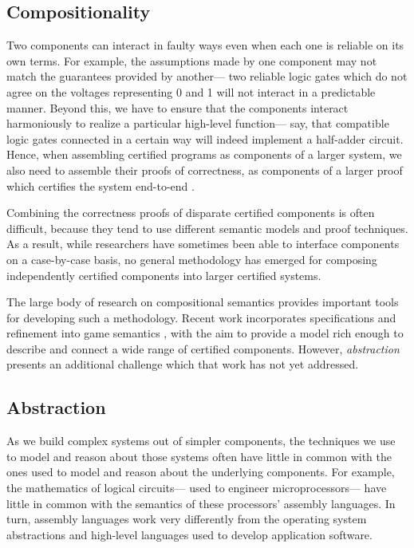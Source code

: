 \documentclass[acmsmall,review,anonymous]{acmart}\settopmatter{printfolios=true,printccs=false,printacmref=false}
\begin{document}
\subsection{Compositionality}

Two components can interact in faulty ways
even when each one is reliable on its own terms.
For example,
the assumptions made by one component
may not match the guarantees provided by another---%
two reliable logic gates which do not agree
on the voltages representing 0 and 1
will not interact in a predictable manner.
Beyond this,
we have to ensure that the components
interact harmoniously
to realize a particular high-level function---%
say, that compatible logic gates
connected in a certain way will indeed
implement a half-adder circuit.
Hence, when assembling certified programs
as components of a larger system,
we also need to assemble their proofs of correctness,
as components of a larger proof
which certifies the system end-to-end \cite{deepspec}.


Combining the correctness proofs
of disparate certified components
is often difficult,
because they
tend to use different semantic models and proof techniques.
As a result,
while researchers have sometimes been able to interface
components on a case-by-case basis,
no general methodology has emerged
for composing independently certified components
into larger certified systems.

The large body of research on compositional semantics
provides important tools for developing such a methodology.
Recent work incorporates specifications and refinement
into game semantics \cite{rbgs-cal},
with the aim to provide a model rich enough
to describe and connect
a wide range of certified components.
However,
\emph{abstraction} presents an additional challenge
which that work has not yet addressed.

\subsection{Abstraction}

As we build complex systems out of simpler components,
the techniques we use to model and reason about those systems
often have little in common with
the ones used to model and reason about the underlying components.
For example,
the mathematics of logical circuits---%
used to engineer microprocessors---%
have little in common with
the semantics of these processors' assembly languages.
In turn, assembly languages work very differently from
the operating system abstractions and
high-level languages used to develop application software.
\end{document}
